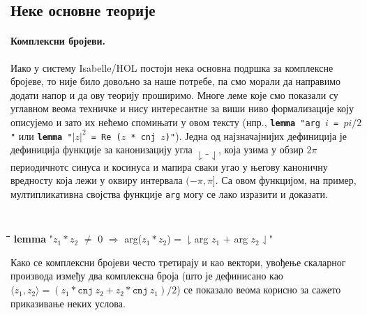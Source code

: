 \subsection{Неке основне теорије}

\paragraph{Комплексни бројеви.}
Иако у систему Isabelle/HOL постоји нека основна подршка за комплексне
бројеве, то није било довољно за наше потребе, па смо морали да
направимо додати напор и да ову теорију проширимо. Многе леме које смо
показали су углавном веома техничке и нису интересантне за виши ниво
формализације коју описујемо и зато их нећемо спомињати у овом тексту
(нпр., {\tt {\bf lemma} "arg $i$ = $pi/2$"} или {\tt {\bf lemma}
  "$|z|^2$ = Re ($z$ * cnj $z$)"}). Једна од најзначајнијих дефиниција
је дефиниција функције за канонизацију угла $\downharpoonright \_
\downharpoonleft$, која узима у обзир $2\pi$ периодичнотс синуса и
косинуса и мапира сваки угао у његову каноничну вредносту која лежи у
оквиру интервала $(-\pi, \pi]$. Са овом функцијом, на пример,
мултипликативна својства функције {\tt arg} могу се лако изразити и
доказати.
{\tt
  \begin{tabbing}
    \hspace{5mm}\=\hspace{5mm}\=\hspace{5mm}\=\hspace{5mm}\=\hspace{5mm}\=\kill
    {\bf lemma} "$z_1 * z_2$ $\neq$ 0 $\Longrightarrow$ arg($z_1 * z_2$) = $\downharpoonright$arg $z_1$ $+$ arg $z_2$$\downharpoonleft$"
  \end{tabbing}
} 

\noindent Како се комплексни бројеви често третирају и као вектори,
увођење скаларног производа између два комплексна броја (што је
дефинисано као $\langle z_1, z_2\rangle = (z_1*\mathtt{cnj}\ z_2 +
z_2*\mathtt{cnj}\ z_1) / 2$) се показало веома корисно за сажето
приказивање неких услова.



